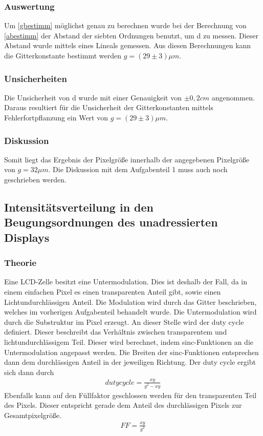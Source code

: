 \subsubsection{Auswertung}
Um \cref{gbestimm} möglichst genau zu berechnen wurde bei der Berechnung von \cref{abestimm} der Abstand der siebten Ordnungen benutzt, um d zu messen. Dieser Abstand wurde mittels eines Lineals gemessen. Aus diesen Berechnungen kann die Gitterkonstante bestimmt werden $g = (29 \pm 3) \mu m$.
\subsubsection{Unsicherheiten}
Die Unsicherheit von d wurde mit einer Genauigkeit von $\pm 0,2cm$ angenommen. Daraus resultiert für die Unsicherheit der Gitterkonstanten mittels Fehlerfortpflanzung ein Wert von $g = (29 \pm 3) \mu m$.
\subsubsection{Diskussion}
Somit liegt das Ergebnis der Pixelgröße innerhalb der angegebenen Pixelgröße von $g = 32 \mu m$.
Die Diskussion mit dem Aufgabenteil 1 muss auch noch geschrieben werden.

\subsection{Intensitätsverteilung in den Beugungsordnungen des unadressierten Displays}
\subsubsection{Theorie}
Eine LCD-Zelle besitzt eine Untermodulation. Dies ist deshalb der Fall, da in einem einfachen Pixel es einen transparenten Anteil gibt, sowie einen Lichtundurchlässigen Anteil. Die Modulation wird durch das Gitter beschrieben, welches im vorherigen Aufgabenteil behandelt wurde. Die Untermodulation wird durch die Substruktur im Pixel erzeugt. An dieser Stelle wird der duty cycle definiert. Dieser beschreibt das Verhältnis zwischen transparentem und lichtundurchlässigem Teil. 
Dieser wird berechnet, indem sinc-Funktionen an die Untermodulation angepasst werden. Die Breiten der sinc-Funktionen entsprechen dann dem durchlässigen Anteil in der jeweiligen Richtung. 
Der duty cycle ergibt sich dann durch
\begin{align}
	duty cycle = \frac{xy}{g^{2}-xy}
	\label{dutycyc}
\end{align}
Ebenfalls kann auf den Füllfaktor geschlossen werden für den transparenten Teil des Pixels. Dieser entspricht gerade dem Anteil des durchlässigen Pixels zur Gesamtpixelgröße.
\begin{align}
	FF = \frac{xy}{g^{2}}
	\label{ff}
\end{align}

